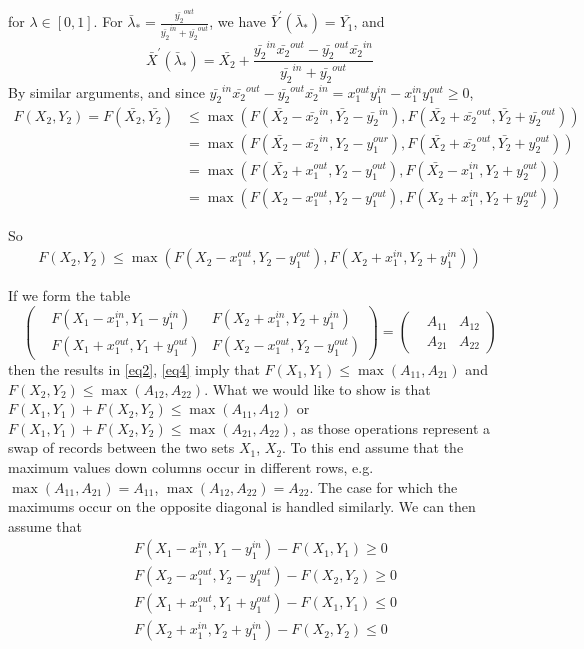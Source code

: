\documentclass{article}
\theoremstyle{case}
\begin{document}
for $\lambda \in \left[ 0,1\right]$. For $\bar{\lambda}_{*} = \frac{\bar{y_2}^{out}}{\bar{y_2}^{in} + \bar{y_2}^{out}}$, we have $\bar{Y}^\prime\left( \bar{\lambda}_{*}\right) = \bar{Y_1}$, and 
\[\bar{X}^\prime\left( \bar{\lambda}_{*}\right) = \bar{X_2} + \frac{\bar{y_2}^{in}\bar{x_2}^{out}-\bar{y_2}^{out}\bar{x_2}^{in}}{\bar{y_2}^{in} + \bar{y_2}^{out}}\]
By similar arguments, and since $\bar{y_2}^{in}\bar{x_2}^{out}-\bar{y_2}^{out}\bar{x_2}^{in} = x_1^{out}y_1^{in} - x_1^{in}y_1^{out} \geq 0$, 
\begin{align*}
F(X_2, Y_2) = F(\bar{X_2}, \bar{Y_2}) & \leq \max{\left(F(\bar{X_2}-\bar{x_2}^{in},\bar{Y_2}-\bar{y_2}^{in}), F(\bar{X_2}+\bar{x_2}^{out},\bar{Y_2}+\bar{y_2}^{out})\right)} \\
& = \max{\left(F(\bar{X_2}-\bar{x_2}^{in},Y_2-y_1^{our}), F(\bar{X_2}+\bar{x_2}^{out},\bar{Y_2}+y_2^{out})\right)} \\
& = \max{\left(F(\bar{X_2} +x_1^{out},Y_2-y_1^{out}), F(\bar{X_2}-x_1^{in},Y_2+y_2^{out})\right)} \\
& = \max{\left(F(X_2 -x_1^{out},Y_2-y_1^{out}), F(X_2+x_1^{in},Y_2+y_2^{out})\right)}
\end{align*}

So
\begin{align} \label{eq4}
F(X_2, Y_2) \leq \max{\left(F(X_2-x_1^{out},Y_2-y_1^{out}), F(X_2+x_1^{in},Y_2+y_1^{in})\right)}
\end{align}

If we form the table
\[
\begin{pmatrix}
&F(X_1 - x_1^{in}, Y_1 - y_1^{in}) & F(X_2 + x_1^{in}, Y_2 + y_1^{in}) \\
&F(X_1 + x_1^{out}, Y_1 + y_1^{out}) & F(X_2 - x_1^{out}, Y_2 - y_1^{out})
\end{pmatrix} = \begin{pmatrix}
&A_{11} & A_{12} \\
&A_{21} & A_{22}
\end{pmatrix}
\]
then the results in \ref{eq2}, \ref{eq4} imply that $F(X_1, Y_1) \leq \max{\left(A_{11}, A_{21}\right)}$ and $F(X_2, Y_2) \leq \max{\left(A_{12}, A_{22}\right)}$. What we would like to show is that $F(X_1, Y_1) + F(X_2, Y_2) \leq \max{\left(A_{11}, A_{12}\right)}$ or $F(X_1, Y_1) + F(X_2, Y_2) \leq \max{\left(A_{21}, A_{22}\right)}$, as those operations represent a swap of records between the two sets $X_1$, $X_2$. To this end assume that the maximum values down columns occur in different rows, e.g. $\max{\left(A_{11}, A_{21}\right)} = A_{11}$, $\max{\left(A_{12}, A_{22}\right)} = A_{22}$. The case for which the maximums occur on the opposite diagonal is handled similarly. We can then assume that 
\begin{align}
& F(X_1 - x_1^{in}, Y_1 - y_1^{in}) - F(X_1, Y_1) \geq 0 \\
& F(X_2 - x_1^{out}, Y_2 - y_1^{out}) - F(X_2, Y_2) \geq 0 \\
& F(X_1 + x_1^{out}, Y_1 + y_1^{out}) - F(X_1, Y_1) \leq 0 \\
& F(X_2 + x_1^{in}, Y_2 + y_1^{in}) - F(X_2, Y_2) \leq 0
\end{align}
\end{document}
